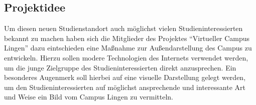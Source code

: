 \subsection{Projektidee}
\label{sec:Projektidee}

Um diesen neuen Studienstandort auch möglichst vielen Studieninteressierten
bekannt zu machen haben sich die Mitglieder des Projektes "`Virtueller Campus
Lingen"' dazu eintschieden eine Maßnahme zur Außendarstellung des Campus zu
entwickeln. Hierzu sollen modere Technologien des Internets verwendet werden, um
die junge Zielgruppe des Studieninteressierten direkt anzusprechen. Ein
besonderes Augenmerk soll hierbei auf eine visuelle Darstellung gelegt werden,
um den Studieninteressierten auf möglichst ansprechende und interessante Art und
Weise ein Bild vom Campus Lingen zu vermitteln.

